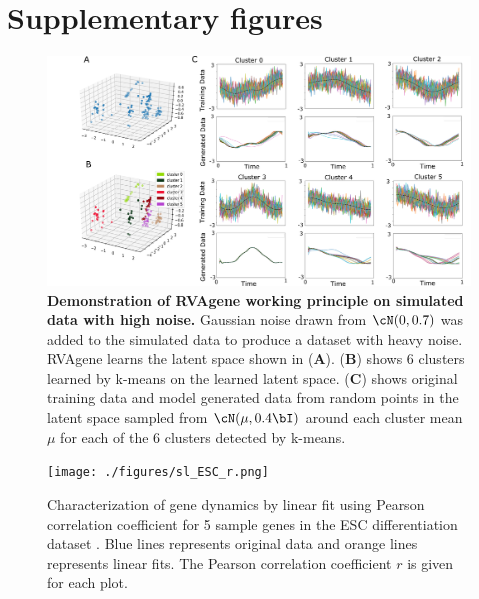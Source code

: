 \section*{Supplementary figures}
\label{supp}


\renewcommand{\thefigure}{S\arabic{figure}}
\setcounter{figure}{0}
\begin{center}
\begin{figure}[H]
  \includegraphics[width=\linewidth]{./figures/noisy_sim.png}
    \caption[Demonstration of RVAgene working principle on simulated data with high noise.]{\textbf{Demonstration of RVAgene working principle on simulated data with high noise.} Gaussian noise drawn from $\cN(0,0.7)$ was added to the simulated data to produce a dataset with heavy noise. RVAgene learns the latent space shown in ({\bf A}). ({\bf B}) shows 6 clusters learned by k-means on the learned latent space. ({\bf C}) shows original training data and model generated data from random points in the latent space sampled from $\cN(\mu,0.4\bI)$ around each cluster mean $\mu$ for each of the 6 clusters detected by k-means.}
  \label{fig:figS1}
\end{figure}
\end{center}
\newpage

\begin{center}
\begin{figure}[H]
  \texttt{[image: ./figures/sl\_ESC\_r.png]}
    \caption[Characterization of gene dynamics by linear fit using Pearson correlation coefficient for 5 sample genes in the ESC differentiation dataset]{Characterization of gene dynamics by linear fit using Pearson correlation coefficient for 5 sample genes in the ESC differentiation dataset  \citep{Klein2015}. Blue lines represents original data and orange lines represents linear fits. The Pearson correlation coefficient $r$ is given for each plot.}
  \label{fig:figS2}
\end{figure}
\end{center}
\newpage


